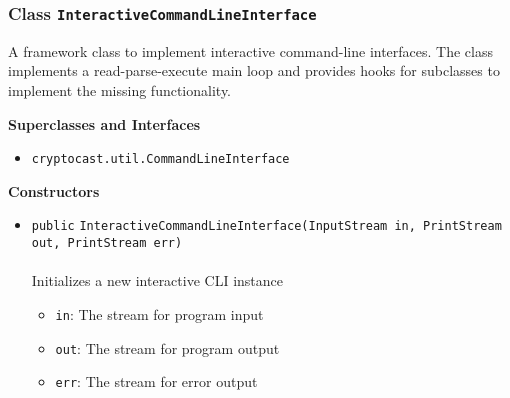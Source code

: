 \subsubsection{Class \lstinline|InteractiveCommandLineInterface|}
A framework class to implement interactive command-line interfaces. The class implements
 a read-parse-execute main loop and provides hooks for subclasses to implement the missing
 functionality. \\
\noindent\begin{minipage}[t]{5cm}
\vspace{0.3em}
\hspace*{2em}
\vspace{0.3em}
\end{minipage}



\textbf{\sffamily Superclasses and Interfaces}
\begin{itemize}
\item \lstinline|cryptocast.util.CommandLineInterface|
\end{itemize}


\textbf{\sffamily Constructors}
\begin{itemize}
\item \lstinline|public| \lstinline|InteractiveCommandLineInterface|\lstinline|(InputStream in, PrintStream out, PrintStream err)|\\ \\[-0.6em]
Initializes a new interactive CLI instance
\begin{itemize}
\item \lstinline|in|: The stream for program input
\item \lstinline|out|: The stream for program output
\item \lstinline|err|: The stream for error output
\end{itemize}



\end{itemize}


